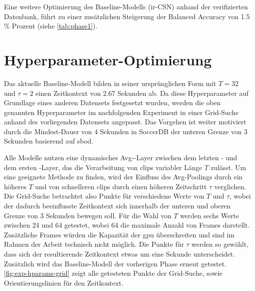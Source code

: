 Eine weitere Optimierung des Baseline-Modells (ir-CSN) anhand der verifizierten Datenbank, führt zu einer zusätzlichen Steigerung der Balanced Accuracy von 1.5 \% Prozent (siehe \autoref{tab:phase1}).

\section{Hyperparameter-Optimierung}
\label{sec:hyperparameter-optimierung}

Das aktuelle Baseline-Modell bilden in seiner ursprünglichen Form mit $T=32$ und $\tau = 2$ einen Zeitkontext von 2.67 Sekunden ab.
Da diese Hyperparameter auf Grundlage eines anderen Datensets festgesetzt wurden, werden die oben genannten Hyperparameter im nachfolgenden Experiment in einer Grid-Suche anhand des vorliegenden Datensets angepasst.
Das Vorgehen ist weiter motiviert durch die Mindest-Dauer von 4 Sekunden in SoccerDB \bzw der unteren Grenze von 3 Sekunden basierend auf \gls{sbod}.

Alle Modelle nutzen eine dynamisches Avg-\pool-Layer zwischen dem letzten \conv- und dem ersten \fc-Layer, das die Verarbeitung von \glspl{clip} variabler Länge $T$ zulässt.
Um eine geeignete Methode zu finden, wird der Einfluss des Avg-Poolings durch ein höheres $T$ und von schnelleren \glspl{clip} durch einen höheren Zeitschritt $\tau$ verglichen.
Die Grid-Suche betrachtet also Punkte für verschiedene Werte von $T$ und $\tau$, wobei der dadurch beeinflusste Zeitkontext sich innerhalb der unteren und oberen Grenze von 3  Sekunden bewegen soll.
Für die Wahl von $T$ werden sechs Werte zwischen 24 und 64 getestet, wobei 64 die maximale Anzahl von Frames darstellt.
Zusätzliche Frames würden die Kapazität der \gls{gpu} überschreiten und sind im Rahmen der Arbeit technisch nicht möglich.
Die Punkte für $\tau$ werden so gewählt, dass sich der resultierende Zeitkontext etwas um eine Sekunde unterscheidet.
Zusätzlich wird das Baseline-Modell der vorherigen Phase erneut getestet.
\autoref{fig:exp-hparams-grid} zeigt alle getesteten Punkte der Grid-Suche, sowie Orientierungslinien für den Zeitkontext.

